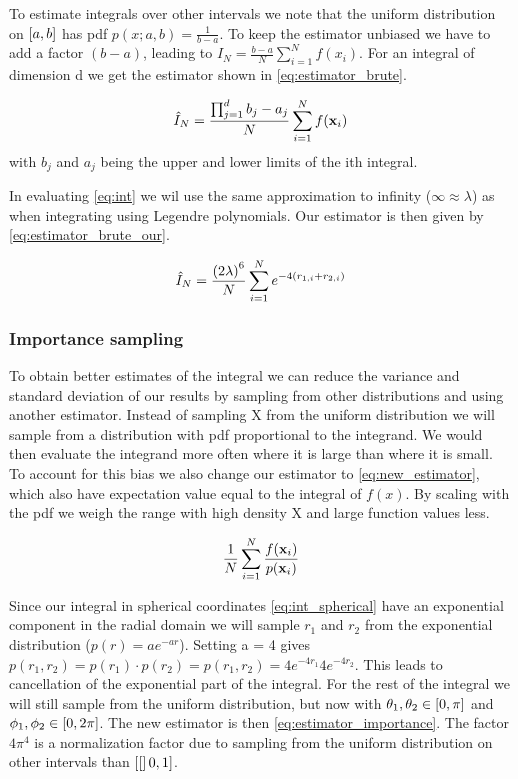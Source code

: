 To estimate integrals over other intervals we note that the uniform
distribution on $\left[a,b\right]$ has pdf $p(x;a,b) = \frac{1}{b-a}$.
To keep the estimator unbiased we have to add a factor $(b-a)$, leading to
$\hat{I}_N = \frac{b-a}{N}\sum_{i=1}^{N}f(x_i)$.
For an integral of dimension d we get the estimator shown in \cref{eq:estimator_brute}.

\begin{equation}
  \label{eq:estimator_brute}
  \hat{I}_N
  = \frac{\prod_{j=1}^{d} b_j - a_j }{N}\sum_{i=1}^{N} f(\mathbf{x}_i)
\end{equation}
with $b_j$ and $a_j$ being the upper and lower limits of the ith integral.

In evaluating \cref{eq:int} we wil use the same approximation to infinity
($\infty \approx \lambda$) as when integrating using Legendre polynomials. Our
estimator is then given by \cref{eq:estimator_brute_our}.

\begin{equation}
  \label{eq:estimator_brute_our}
  \hat{I}_N
  = \frac{\left(2\lambda\right)^6}{N} \sum_{i=1}^{N} e^{-4(r_{1,i} + r_{2,i})}
\end{equation}



\subsubsection{Importance sampling}

To obtain better estimates of the integral we can reduce the variance and
standard deviation of our results by sampling from other distributions and using
another estimator. Instead of sampling X from the uniform distribution we will
sample from a distribution with pdf proportional to the integrand. We would then
evaluate the integrand more often where it is large than where it is small. To
account for this bias we also change our estimator to \cref{eq:new_estimator},
which also have expectation value equal to the integral of $f(x)$.
By scaling with the pdf we weigh the range with high density X and large
function values less.

\begin{equation}
  \label{eq:new_estimator}
  \frac{1}{N} \sum_{i=1}^{N} \frac{f(\mathbf{x}_i)}{p(\mathbf{x}_i)}
\end{equation}


Since our integral in spherical coordinates \cref{eq:int_spherical} have an exponential
component in the radial domain we will sample $r_1$ and $r_2$ from the exponential distribution
($p(r) = ae^{-ar}$). Setting a = 4 gives
$p(r_1, r_2) = p(r_1) \cdot p(r_2) = p(r_1,r_2) = 4e^{-4r_1} 4e^{-4r_2}$.
This leads to cancellation of the exponential part of the integral. For the
rest of the integral we will still sample from the uniform distribution,
but now with $\theta_1, \theta_2 \in \left[0, \pi\right]$ and
$\phi_1, \phi_2 \in \left[0, 2\pi\right]$.
The new estimator is then
\cref{eq:estimator_importance}. The factor $4\pi^4$ is a normalization factor due
to sampling from the uniform distribution on other intervals than $\left[[\right]0,1]$.

